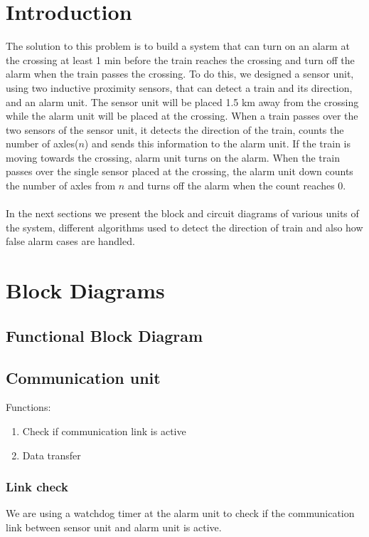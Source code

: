 \documentclass[aps,letterpaper,11pt]{article}
\begin{document}
\section{Introduction}
The solution to this problem is to build a system that can turn on an alarm at the crossing at least 1 min
before the train reaches the crossing and turn off the alarm when the train passes the crossing. To do this, we
designed a sensor unit, using two inductive proximity sensors, that can detect a train and its direction,
and an alarm unit. The sensor unit will be placed 1.5 km away from the crossing while the alarm unit will be
placed at the crossing. When a train passes over the two sensors of the sensor unit, it detects the direction
of the train, counts the number of axles\footnotemark{}($n$) and sends this information to the alarm unit. If the train is moving
towards the crossing, alarm unit turns on the alarm. When the train passes over the single sensor placed at the crossing,
the alarm unit down counts the number of axles from $n$ and turns off the alarm when the count reaches 0.
\\ \\
In the next sections we present the block and circuit diagrams of various units of the system, different
algorithms used to detect the direction of train and also how false alarm cases are handled.

\section{Block Diagrams}
\subsection{Functional Block Diagram}


\subsection{Communication unit}
Functions:
\begin{enumerate}
  \item Check if communication link is active
  \item Data transfer
\end{enumerate}

\subsubsection{Link check}
We are using a watchdog timer at the alarm unit to check if the communication
link
between sensor unit and alarm unit is active.
\end{document}
